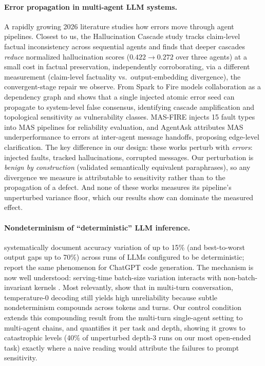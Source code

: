 \documentclass[11pt]{article}
\begin{document}
\paragraph{Error propagation in multi-agent LLM systems.} A rapidly growing
2026 literature studies how errors move through agent pipelines. Closest to
us, the Hallucination Cascade study \citep{hallucascade2026} tracks
claim-level factual inconsistency across sequential agents and finds that
deeper cascades \emph{reduce} normalized hallucination scores
($0.422 \to 0.272$ over three agents) at a small cost in factual
preservation, independently corroborating, via a different measurement
(claim-level factuality vs.\ output-embedding divergence), the
convergent-stage repair we observe. From Spark to Fire \citep{spark2026}
models collaboration as a dependency graph and shows that a single injected
atomic error seed can propagate to system-level false consensus, identifying
cascade amplification and topological sensitivity as vulnerability classes.
MAS-FIRE \citep{masfire2026} injects 15 fault types into MAS pipelines for
reliability evaluation, and AgentAsk \citep{agentask2025} attributes MAS
underperformance to errors at inter-agent message handoffs, proposing
edge-level clarification. The key difference in our design: these works
perturb with \emph{errors}: injected faults, tracked hallucinations,
corrupted messages. Our perturbation is \emph{benign by construction}
(validated semantically equivalent paraphrases), so any divergence we
measure is attributable to sensitivity rather than to the propagation of a
defect. And none of these works measures its pipeline's unperturbed variance
floor, which our results show can dominate the measured effect.

\paragraph{Nondeterminism of ``deterministic'' LLM inference.}
\citet{atil2024} systematically document accuracy variation of up to 15\%
(and best-to-worst output gaps up to 70\%) across runs of LLMs configured to
be deterministic; \citet{ouyang2023} report the same phenomenon for ChatGPT
code generation. The mechanism is now well understood: serving-time
batch-size variation interacts with non-batch-invariant kernels
\citep{he2025}. Most relevantly, \citet{laban2025} show that in multi-turn
conversation, temperature-0 decoding still yields high unreliability because
subtle nondeterminism compounds across tokens and turns. Our control
condition extends this compounding result from the multi-turn single-agent
setting to multi-agent chains, and quantifies it per task and depth,
showing it grows to catastrophic levels (40\% of unperturbed depth-3 runs on
our most open-ended task) exactly where a naive reading would attribute the
failures to prompt sensitivity.
\end{document}
